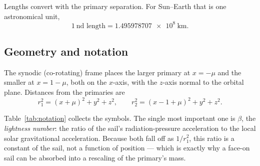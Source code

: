 \documentclass[11pt,a4paper]{article}
\begin{document}
Lengths convert with the primary separation. For Sun--Earth that is one
astronomical unit,
\begin{equation}
  1\ \text{nd length} = \SI{1.495978707e8}{\kilo\metre} .
  \label{eq:lengthunit}
\end{equation}

\subsection{Geometry and notation}

The synodic (co-rotating) frame places the larger primary at $x=-\mu$ and the
smaller at $x=1-\mu$, both on the $x$-axis, with the $z$-axis normal to the
orbital plane. Distances from the primaries are
\begin{equation}
  r_1^2 = (x+\mu)^2+y^2+z^2, \qquad
  r_2^2 = (x-1+\mu)^2+y^2+z^2 .
\end{equation}

Table~\ref{tab:notation} collects the symbols. The single most important one is
$\beta$, the \emph{lightness number}: the ratio of the sail's
radiation-pressure acceleration to the local solar gravitational acceleration.
Because both fall off as $1/r_1^2$, this ratio is a constant of the sail, not a
function of position --- which is exactly why a face-on sail can be absorbed
into a rescaling of the primary's mass.
\end{document}
